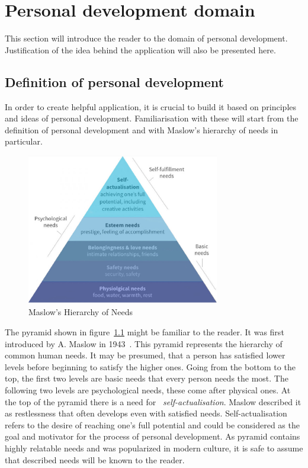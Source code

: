 

\chapter{Personal development domain}\label{ch:personal-development-domain}


This section will introduce the reader to the domain of personal development.
Justification of the idea behind the application will also be presented here.



\section{Definition of personal development}\label{sec:definition-of-personal-development}

In order to create helpful application, it is crucial to build it based on principles and ideas of personal development.
Familiarisation with these will start from the definition of personal development and with Maslow's hierarchy of needs in particular.

\begin{figure}[h]
    \includegraphics[width=0.75\textwidth]{images/maslows.jpg}
    \caption{Maslow's Hierarchy of Needs ~\cite{maslow-pyramid}}
    \label{fig:maslow-pyramid}
\end{figure}

The pyramid shown in figure~\ref{fig:maslow-pyramid} might be familiar to the reader.
It was first introduced by A. Maslow in 1943~\cite{maslow-motivation}.
This pyramid represents the hierarchy of common human needs.
It may be presumed, that a person has satisfied lower levels before beginning to satisfy the higher ones.
Going from the bottom to the top, the first two levels are basic needs that every person needs the most.
The following two levels are psychological needs, these come after physical ones.
At the top of the pyramid there is a need for ~\textit{self-actualisation}.
Maslow described it as restlessness that often develops even with satisfied needs.
Self-actualisation refers to the desire of reaching one's full potential and could be considered as the goal and motivator for the process of personal development.
As pyramid contains highly relatable needs and was popularized in modern culture, it is safe to assume that described needs will be known to the reader.

